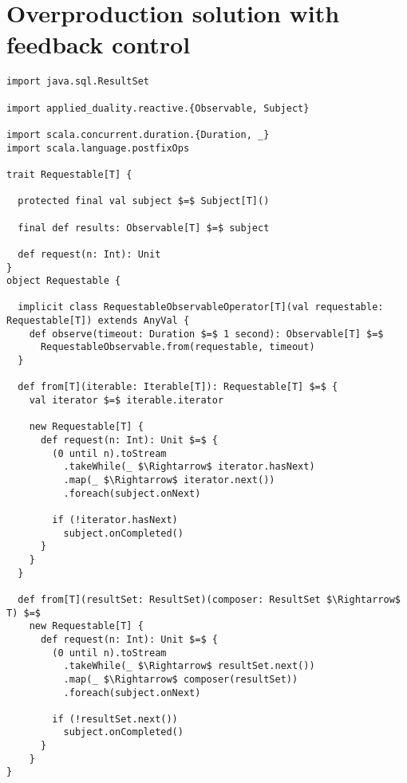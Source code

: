 \chapter{Overproduction solution with feedback control}
\label{app:backpressure-solution}

\begin{lstlisting}[style=ScalaStyle, caption={Universal, interactive interface}]
import java.sql.ResultSet

import applied_duality.reactive.{Observable, Subject}

import scala.concurrent.duration.{Duration, _}
import scala.language.postfixOps

trait Requestable[T] {

  protected final val subject $=$ Subject[T]()

  final def results: Observable[T] $=$ subject

  def request(n: Int): Unit
}
object Requestable {

  implicit class RequestableObservableOperator[T](val requestable: Requestable[T]) extends AnyVal {
    def observe(timeout: Duration $=$ 1 second): Observable[T] $=$
      RequestableObservable.from(requestable, timeout)
  }

  def from[T](iterable: Iterable[T]): Requestable[T] $=$ {
    val iterator $=$ iterable.iterator

    new Requestable[T] {
      def request(n: Int): Unit $=$ {
        (0 until n).toStream
          .takeWhile(_ $\Rightarrow$ iterator.hasNext)
          .map(_ $\Rightarrow$ iterator.next())
          .foreach(subject.onNext)

        if (!iterator.hasNext)
          subject.onCompleted()
      }
    }
  }

  def from[T](resultSet: ResultSet)(composer: ResultSet $\Rightarrow$ T) $=$
    new Requestable[T] {
      def request(n: Int): Unit $=$ {
        (0 until n).toStream
          .takeWhile(_ $\Rightarrow$ resultSet.next())
          .map(_ $\Rightarrow$ composer(resultSet))
          .foreach(subject.onNext)

        if (!resultSet.next())
          subject.onCompleted()
      }
    }
}
\end{lstlisting}

